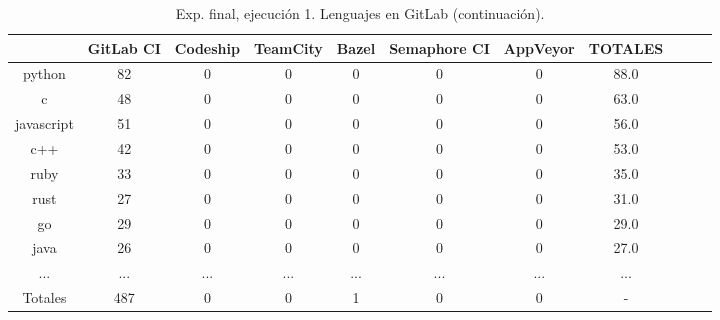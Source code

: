 \begin{table}
  \centering
  \caption{Exp. final, ejecución 1. Lenguajes en GitLab (continuación).}
  \label{tab:tabla_f1_6b}

\begin{footnotesize}
\renewcommand{\arraystretch}{1.5} %
\begin{tabular}{ccccccccccc}
  \hline
  {} &  GitLab CI &  Codeship &  TeamCity &  Bazel &  Semaphore CI &  AppVeyor &  TOTALES \\
  \hline
  python           &        82 &         0 &         0 &      0 &             0 &         0 &     88.0 \\
  c                &        48 &         0 &         0 &      0 &             0 &         0 &     63.0 \\
  javascript       &        51 &         0 &         0 &      0 &             0 &         0 &     56.0 \\
  c++              &        42 &         0 &         0 &      0 &             0 &         0 &     53.0 \\
  ruby             &        33 &         0 &         0 &      0 &             0 &         0 &     35.0 \\
  rust             &        27 &         0 &         0 &      0 &             0 &         0 &     31.0 \\
  go               &        29 &         0 &         0 &      0 &             0 &         0 &     29.0 \\
  java             &        26 &         0 &         0 &      0 &             0 &         0 &     27.0 \\
  ...              &       ... &       ... &       ... &    ... &           ... &       ... &      ... \\
  \hline
  Totales          &       487 &         0 &         0 &      1 &             0 &         0 &      - \\
 \end{tabular}
\end{footnotesize}

\end{table}


